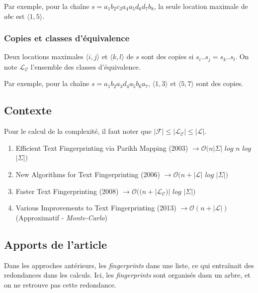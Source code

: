 \documentclass[a4paper]{article}
\begin{document}
Par exemple, pour la chaîne $s = a_{1} b_{2} c_{3} a_{4} a_{5} d_{6} d_{7} b_{8}$, la seule location maximale de $abc$ est $\langle1,5\rangle$.

\subsubsection{Copies et classes d'équivalence}

Deux locations maximales $\langle i,j \rangle$ et $\langle k,l \rangle$ de $s$ sont des copies si $s_{i}..s_{j} = s_{k}..s_{l}$. On note $\mathcal{L}_{\mathcal{C}}$ l'ensemble des classes d'équivalence. \newline

Par exemple, pour la chaîne $s = a_{1} b_{2} a_{3} d_{4} a_{5} b_{6} a_{7}$, $\langle1,3\rangle$ et $\langle5,7\rangle$ sont des copies.

\subsection{Contexte}

Pour le calcul de la complexité, il faut noter que $|\mathcal{F}| \leq |\mathcal{L}_{\mathcal{C}}| \leq |\mathcal{L}|$.

\begin{enumerate}
	\item Efficient Text Fingerprinting via Parikh Mapping (2003) \newline
$\rightarrow \mathcal{O}(n|\Sigma|$ $log$ $n$ $log$ $|\Sigma|)$
	\item New Algorithms for Text Fingerprinting (2006) \newline
$\rightarrow \mathcal{O}(n + |\mathcal{L}|$ $log$ $|\Sigma|)$
	\item Faster Text Fingerprinting (2008) \newline
$\rightarrow \mathcal{O}((n + |\mathcal{L}_{\mathcal{C}})|$ $log$ $|\Sigma|)$
	\item Various Improvements to Text Fingerprinting (2013) \newline
$\rightarrow \mathcal{O}(n + |\mathcal{L}|)$ (Approximatif - \emph{Monte-Carlo})
\end{enumerate}

\subsection{Apports de l'article}

Dans les approches antérieurs, les \emph{fingerprints} dans une liste, ce qui entraînait des redondances dans les calculs. Ici, les \emph{fingerprints} sont organisés dasn un arbre, et on ne retrouve pas cette redondance.
\end{document}
